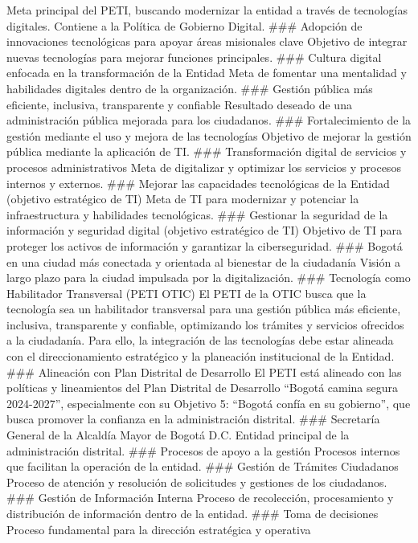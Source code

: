 \documentclass[
	a4paper, %
	12pt, %
]{include/CSSullivanBusinessReport}
\begin{document}
Meta principal del PETI, buscando modernizar la entidad a través de
tecnologías digitales. Contiene a la Política de Gobierno Digital.
\#\#\# Adopción de innovaciones tecnológicas para apoyar áreas
misionales clave Objetivo de integrar nuevas tecnologías para mejorar
funciones principales. \#\#\# Cultura digital enfocada en la
transformación de la Entidad Meta de fomentar una mentalidad y
habilidades digitales dentro de la organización. \#\#\# Gestión pública
más eficiente, inclusiva, transparente y confiable Resultado deseado de
una administración pública mejorada para los ciudadanos. \#\#\#
Fortalecimiento de la gestión mediante el uso y mejora de las
tecnologías Objetivo de mejorar la gestión pública mediante la
aplicación de TI. \#\#\# Transformación digital de servicios y procesos
administrativos Meta de digitalizar y optimizar los servicios y procesos
internos y externos. \#\#\# Mejorar las capacidades tecnológicas de la
Entidad (objetivo estratégico de TI) Meta de TI para modernizar y
potenciar la infraestructura y habilidades tecnológicas. \#\#\#
Gestionar la seguridad de la información y seguridad digital (objetivo
estratégico de TI) Objetivo de TI para proteger los activos de
información y garantizar la ciberseguridad. \#\#\# Bogotá en una ciudad
más conectada y orientada al bienestar de la ciudadanía Visión a largo
plazo para la ciudad impulsada por la digitalización. \#\#\# Tecnología
como Habilitador Transversal (PETI OTIC) El PETI de la OTIC busca que la
tecnología sea un habilitador transversal para una gestión pública más
eficiente, inclusiva, transparente y confiable, optimizando los trámites
y servicios ofrecidos a la ciudadanía. Para ello, la integración de las
tecnologías debe estar alineada con el direccionamiento estratégico y la
planeación institucional de la Entidad. \#\#\# Alineación con Plan
Distrital de Desarrollo El PETI está alineado con las políticas y
lineamientos del Plan Distrital de Desarrollo ``Bogotá camina segura
2024-2027'', especialmente con su Objetivo 5: ``Bogotá confía en su
gobierno'', que busca promover la confianza en la administración
distrital. \#\#\# Secretaría General de la Alcaldía Mayor de Bogotá D.C.
Entidad principal de la administración distrital. \#\#\# Procesos de
apoyo a la gestión Procesos internos que facilitan la operación de la
entidad. \#\#\# Gestión de Trámites Ciudadanos Proceso de atención y
resolución de solicitudes y gestiones de los ciudadanos. \#\#\# Gestión
de Información Interna Proceso de recolección, procesamiento y
distribución de información dentro de la entidad. \#\#\# Toma de
decisiones Proceso fundamental para la dirección estratégica y operativa
\end{document}
